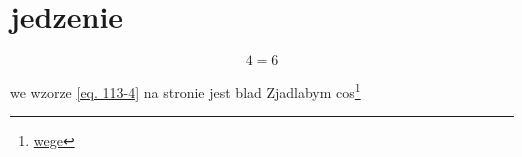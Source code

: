 \documentclass{article}
\begin{document}
\section{jedzenie}

\begin{equation}\label{eq. 113-4}
4=6
\end{equation}

we wzorze \eqref{eq. 113-4} na stronie \pageref{eq. 113-4} jest blad
Zjadlabym cos\footnote{\href{https://biedanizm.pl}{wege}}
\end{document}
